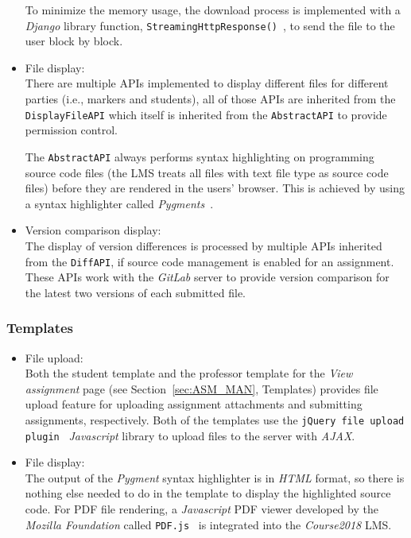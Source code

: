 \begin{itemize}
    To minimize the memory usage, the download process is implemented with
    a \emph{Django} library function,
    \texttt{StreamingHttpResponse()}~\citep[Section Streaming\-Http\-Response
    objects]{DdjangoRequest},
    to send the file to the user block by block.

    \item File display: \\
    There are multiple APIs implemented to display different files for different
    parties
    (i.e., markers and students), all of those APIs are inherited from the
    \texttt{DisplayFileAPI} which itself is inherited from the
    \texttt{AbstractAPI} to provide permission control.

    The \texttt{AbstractAPI} always performs
    syntax highlighting on programming source code files
    (the LMS treats all files with text file type as source code files)
    before they are rendered in the users' browser.
    This is achieved by
    using a syntax highlighter called \emph{Pygments}~\cite{Bpygments}.

    \item Version comparison display: \\
    The display of version differences is processed by multiple APIs inherited
    from the \texttt{Diff\-API}, if source code management is enabled for an
    assignment. These APIs work with the \emph{GitLab} server to provide version
    comparison for the latest two versions of each submitted file.
\end{itemize}

\subsubsection{Templates}
\begin{itemize}
    \item File upload: \\
        Both the student template and the professor template for the
        \emph{View assignment} page (see Section~\ref{sec:ASM_MAN}, Templates)
        provides file upload feature for uploading
        assignment attachments and submitting assignments, respectively.
        Both of the templates use the
        \texttt{jQuery file upload plugin}~\citep[Section Description]{jqFileUpload}
        \emph{Javascript} library to upload files to the server with
        \emph{AJAX}.
    \item File display: \\
        The output of the \emph{Pygment} syntax highlighter is in \emph{HTML}
        format, so there is nothing else needed to do in the template to
        display the highlighted source code.
        For PDF file rendering, a \emph{Javascript} PDF viewer developed
        by the \emph{Mozilla Foundation} called \texttt{PDF.js}~\cite{pdfjs}
        is integrated into the \emph{Course2018} LMS.
\end{itemize}

